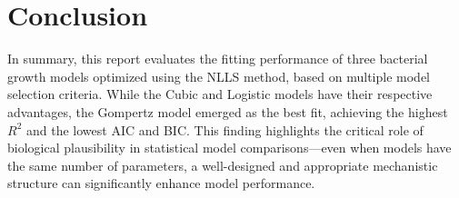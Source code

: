 \documentclass{article}
\begin{document}
\section{Conclusion}
In summary, this report evaluates the fitting performance of three bacterial growth models optimized using the NLLS method, based on multiple model selection criteria. While the Cubic and Logistic models have their respective advantages, the Gompertz model emerged as the best fit, achieving the highest \( R^2 \) and the lowest AIC and BIC. This finding highlights the critical role of biological plausibility in statistical model comparisons—even when models have the same number of parameters, a well-designed and appropriate mechanistic structure can significantly enhance model performance.

\pagebreak


\end{document}
